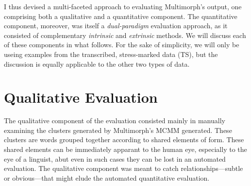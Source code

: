 
I thus devised a multi-faceted approach to evaluating Multimorph's output, one comprising both
a qualitative and a quantitative component. The quantitative component, moreover, 
was itself a \emph{dual-paradigm}
evaluation approach, as it consisted of complementary \emph{intrinsic} and \emph{extrinsic} methods. 
 We will discuss each of these components in what follows. For the sake of simplicity,
we will only be useing examples from the transcribed, stress-marked data (TS),
 but the discussion is equally applicable to
the other two types of data.


\section{Qualitative Evaluation} \label{sec:qualitative}
The qualitative component of the evaluation consisted mainly in manually examining the clusters generated by Multimorph's MCMM generated. These clusters are words grouped together according to shared elements of form. These shared elements can be immediately apparant to the human eye, especially to the eye of a linguist, abut even in such cases they can be lost in an automated evaluation. %
The qualitative component was meant to catch relationships---subtle or obvious---that might elude the automated 
quantitative evaluation. 

